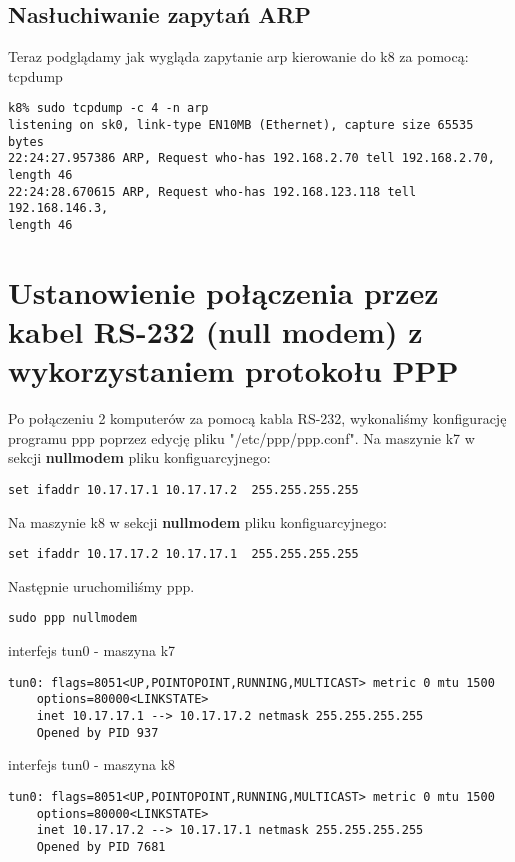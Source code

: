\documentclass[a4paper,11pt,notitlepage]{article}
\begin{document}
\subsection{Nasłuchiwanie zapytań ARP}
Teraz podglądamy jak wygląda zapytanie arp kierowanie do k8 za pomocą: 
tcpdump
\begin{verbatim}
k8% sudo tcpdump -c 4 -n arp
listening on sk0, link-type EN10MB (Ethernet), capture size 65535 bytes
22:24:27.957386 ARP, Request who-has 192.168.2.70 tell 192.168.2.70, 
length 46
22:24:28.670615 ARP, Request who-has 192.168.123.118 tell 192.168.146.3, 
length 46
\end{verbatim}
\section{Ustanowienie połączenia  przez kabel RS-232 (null modem) z wykorzystaniem protokołu PPP}


Po połączeniu 2 komputerów za pomocą kabla RS-232, wykonaliśmy konfigurację programu ppp poprzez edycję pliku "/etc/ppp/ppp.conf".
Na maszynie k7 w sekcji \textbf{nullmodem} pliku konfiguarcyjnego:

\begin{verbatim}
set ifaddr 10.17.17.1 10.17.17.2  255.255.255.255
\end{verbatim}

Na maszynie k8 w sekcji \textbf{nullmodem} pliku konfiguarcyjnego:

\begin{verbatim}
set ifaddr 10.17.17.2 10.17.17.1  255.255.255.255
\end{verbatim}

Następnie uruchomiliśmy ppp.

\begin{verbatim}
sudo ppp nullmodem
\end{verbatim}

interfejs tun0 - maszyna k7
\begin{verbatim}
tun0: flags=8051<UP,POINTOPOINT,RUNNING,MULTICAST> metric 0 mtu 1500
	options=80000<LINKSTATE>
	inet 10.17.17.1 --> 10.17.17.2 netmask 255.255.255.255
	Opened by PID 937
\end{verbatim}

interfejs tun0 - maszyna k8

\begin{verbatim}
tun0: flags=8051<UP,POINTOPOINT,RUNNING,MULTICAST> metric 0 mtu 1500
	options=80000<LINKSTATE>
	inet 10.17.17.2 --> 10.17.17.1 netmask 255.255.255.255
	Opened by PID 7681
\end{verbatim}
\end{document}
